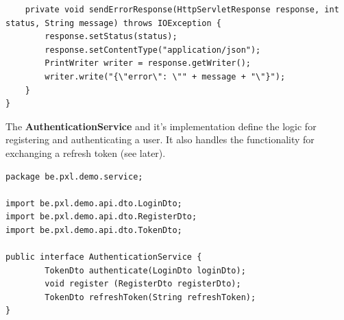 \begin{lstlisting}
    private void sendErrorResponse(HttpServletResponse response, int status, String message) throws IOException {
        response.setStatus(status);
        response.setContentType("application/json");
        PrintWriter writer = response.getWriter();
        writer.write("{\"error\": \"" + message + "\"}");
    }
}
\end{lstlisting}

The \textbf{AuthenticationService} and it's implementation define the logic for registering and authenticating a user.  It also handles the functionality for exchanging a refresh token (see later).

\begin{lstlisting}
package be.pxl.demo.service;

import be.pxl.demo.api.dto.LoginDto;
import be.pxl.demo.api.dto.RegisterDto;
import be.pxl.demo.api.dto.TokenDto;

public interface AuthenticationService {
        TokenDto authenticate(LoginDto loginDto);
        void register (RegisterDto registerDto);
        TokenDto refreshToken(String refreshToken);
}
\end{lstlisting}

